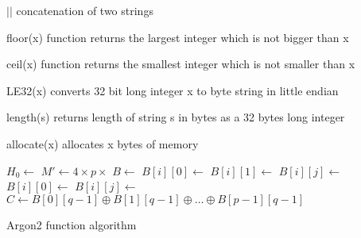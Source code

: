 \documentclass[nolof]{fithesis3}
\begin{document}
\begin{description}
\item{\(||\)} concatenation of two strings

\item{floor(x)} function returns the largest integer which is not bigger than x

\item{ceil(x)} function returns the smallest integer which is not smaller than x

\item{LE32(x)} converts 32 bit long integer x to byte string in little endian

\item{length(s)} returns length of string s in bytes as a 32 bytes long integer

\item{allocate(x)} allocates x bytes of memory
\end{description}

\begin{algorithm}
\DontPrintSemicolon
\LinesNumbered
{}
\(H_0 \leftarrow \)  \;
\(M' \leftarrow 4 \times p \times \)  \;
\(B \leftarrow \)  \;
 {
\(B[i][0] \leftarrow \)  \;
}
 {
\(B[i][1] \leftarrow \)  \;
}
 {
 {
\(B[i][j] \leftarrow \)  \;
}
}
 {
 {
\(B[i][0] \leftarrow \)  \;
 {
\(B[i][j] \leftarrow \)  \;
}
}
}
\(C \leftarrow B[0][q-1] \oplus B[1][q-1] \oplus \dots \oplus B[p-1][q-1]\) \;
\caption{Argon2 function algorithm}
\label{argon2alg}
\end{algorithm}
\end{document}
